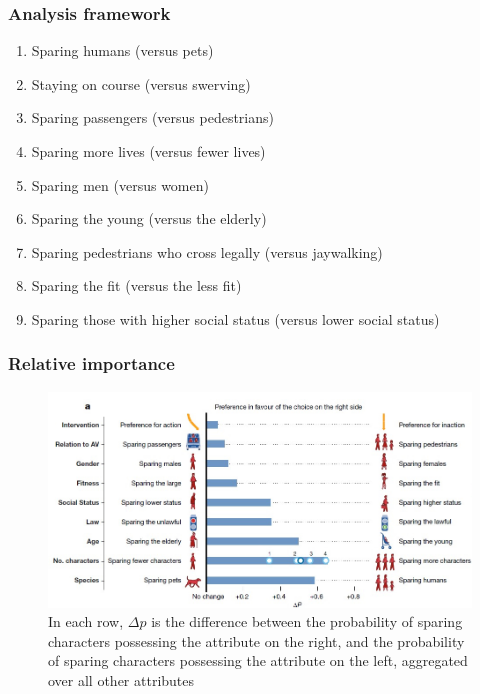 \documentclass[aspectratio=169]{beamer}
\begin{document}
\begin{frame}
    \frametitle{Analysis framework}
    \begin{enumerate}
        \item Sparing humans (versus pets)
        \item Staying on course (versus swerving)
        \item Sparing passengers (versus pedestrians)
        \item Sparing more lives (versus fewer lives)
        \item Sparing men (versus women)
        \item Sparing the young (versus the elderly)
        \item Sparing pedestrians who cross legally (versus jaywalking)
        \item Sparing the fit (versus the less fit)
        \item Sparing those with higher social status (versus lower social status)
    \end{enumerate}
\end{frame}

\begin{frame}
    \frametitle{Relative importance}
    \begin{figure}
        \center
        \includegraphics[width=0.8\linewidth]{assets/relative-importance-mme.jpg}
        \caption{In each row, $\Delta p$ is the difference between the probability of sparing characters possessing the attribute on the right, and the probability of sparing characters possessing the attribute on the left, aggregated over all other attributes}
    \end{figure}
\end{frame}
\end{document}
